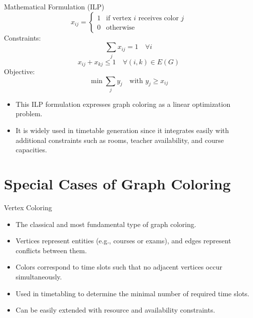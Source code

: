 \documentclass[10pt]{beamer}
\begin{document}
\begin{frame}{Mathematical Formulation (ILP)}
    \small
    \[
        x_{ij} =
        \begin{cases}
            1 & \text{if vertex } i \text{ receives color } j \\
            0 & \text{otherwise}
        \end{cases}
    \]
    Constraints:
    \[
        \sum_j x_{ij} = 1 \quad \forall i
    \]
    \[
        x_{ij} + x_{kj} \le 1 \quad \forall (i,k) \in E(G)
    \]
    Objective:
    \[
        \min \sum_j y_j \quad \text{with } y_j \ge x_{ij}
    \]

    \vspace{0.5em}
    \begin{itemize}
        \item This ILP formulation expresses graph coloring as a linear optimization problem.
        \item It is widely used in timetable generation since it integrates easily with additional constraints such as rooms, teacher availability, and course capacities.
    \end{itemize}
\end{frame}


\section{Special Cases of Graph Coloring}

\begin{frame}{Vertex Coloring}
    \small
    \begin{itemize}
        \item The classical and most fundamental type of graph coloring.
        \item Vertices represent entities (e.g., courses or exams), and edges represent conflicts between them.
        \item Colors correspond to time slots such that no adjacent vertices occur simultaneously.
        \item Used in timetabling to determine the minimal number of required time slots.
        \item Can be easily extended with resource and availability constraints.
    \end{itemize}
\end{frame}
\end{document}
